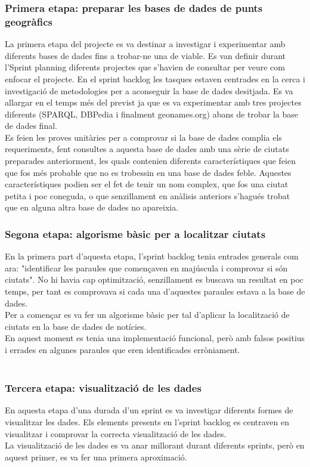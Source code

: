 \documentclass[12pt,a4paper,openright,oneside]{article}
\numberwithin{equation}{section}
\theoremstyle{definition}
\begin{document}
\subsubsection*{Primera etapa: preparar les bases de dades de punts geogràfics}
La primera etapa del projecte es va destinar a investigar i experimentar amb diferents bases de dades fins a trobar-ne una de viable. Es van definir durant l'Sprint planning diferents projectes que s'havien de consultar per veure com enfocar el projecte. En el sprint backlog les tasques estaven centrades en la cerca i investigació de metodologies per a aconseguir la base de dades desitjada. Es va allargar en el temps més del previst ja que es va experimentar amb tres projectes diferents (SPARQL, DBPedia i finalment geonames.org) abans de trobar la base de dades final.\\
Es feien les proves unitàries per a comprovar si la base de dades complia els requeriments, fent consultes a aquesta base de dades amb una sèrie de ciutats preparades anteriorment, les quals contenien diferents característiques que feien que fos més probable que no es trobessin en una base de dades feble. Aquestes característiques podien ser el fet de tenir un nom complex, que fos una ciutat petita i poc coneguda, o que senzillament en anàlisis anteriors s'hagués trobat que en alguna altra base de dades no apareixia.\\
\subsubsection*{Segona etapa: algorisme bàsic per a localitzar ciutats}
En la primera part d'aquesta etapa, l'sprint backlog tenia entrades generals com ara: "identificar les paraules que començaven en majúscula i comprovar si són ciutats". No hi havia cap optimització, senzillament  es buscava un resultat en poc temps, per tant es comprovava si cada una d'aquestes paraules estava a la base de dades.\\ 
Per a començar es va fer un algorisme bàsic per tal d'aplicar la localització de ciutats en la base de dades de notícies.\\
En aquest moment es tenia una implementació funcional, però amb falsos positius i errades en algunes paraules que eren identificades erròniament.\\\\
\subsubsection*{Tercera etapa: visualització de les dades}
En aquesta etapa d'una durada d'un sprint es va investigar diferents formes de visualitzar les dades. Els elements presents en l'sprint backlog es centraven en visualitzar i comprovar la correcta visualització de les dades.\\
La visualització de les dades es va anar millorant durant diferents sprints, però en aquest primer, es va fer una primera aproximació.\\
\end{document}
